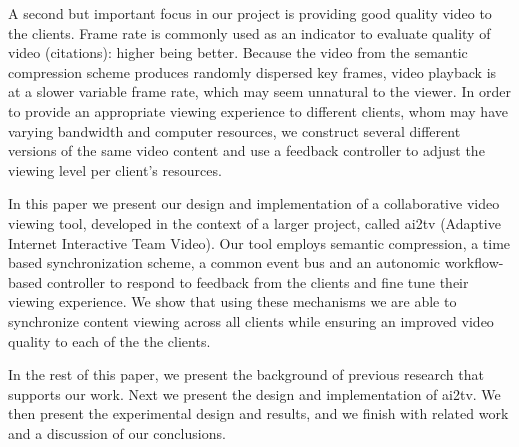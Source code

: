 \documentclass{sig-alternate}
\begin{document}
A second but important focus in our project is providing good quality
video to the clients.  Frame rate is commonly used as an indicator to
evaluate quality of video (citations): higher being better.  Because
the video from the semantic compression scheme produces randomly
dispersed key frames, video playback is at a slower variable frame
rate, which may seem unnatural to the viewer.  In order to provide an
appropriate viewing experience to different clients, whom may have
varying bandwidth and computer resources, we construct several
different versions of the same video content and use a feedback
controller to adjust the viewing level per client's resources.

In this paper we present our design and implementation of a
collaborative video viewing tool, developed in the context of a larger
project, called ai2tv (Adaptive Internet Interactive Team
Video).  Our tool employs semantic compression, a time based
synchronization scheme, a common event bus and an autonomic
workflow-based controller to respond to feedback from the clients and
fine tune their viewing experience.  We show that using these
mechanisms we are able to synchronize content viewing across all
clients while ensuring an improved video quality to each of the the
clients.

In the rest of this paper, we present the background of previous
research that supports our work.  Next we present the design and
implementation of ai2tv.  We then present the experimental
design and results, and we finish with related work and a discussion
of our conclusions.
\end{document}
